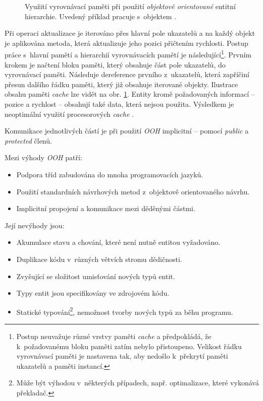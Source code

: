 \begin{figure}[H]
	\centering
	\caption{Využití vyrovnávací paměti při použití \emph{objektově orientované} entitní hierarchie. Uvedený příklad pracuje s~objektem .}
	\label{Fig:OOPCache}
\end{figure}

Při operaci aktualizace je iterováno přes hlavní pole ukazatelů a na každý objekt je aplikována metoda, která aktualizuje jeho pozici přičtením rychlosti. Postup práce s~hlavní pamětí a hierarchií vyrovnávacích pamětí je následující\footnote{Postup neuvažuje různé vrstvy paměti \emph{cache} a předpokládá, že k~požadovanému bloku paměti zatím nebylo přistoupeno. Velikost řádku vyrovnávací paměti je nastavena tak, aby nedošlo k~překrytí paměti ukazatelů a paměti instancí.}. Prvním krokem je načtení bloku paměti, který obsahuje část pole ukazatelů, do vyrovnávací paměti. Následuje dereference prvního z~ukazatelů, která zapříčiní přesun dalšího řádku paměti, který již obsahuje iterované objekty. Ilustrace obsahu paměti \emph{cache} lze vidět na obr. \ref{Fig:OOPCache}. Entity kromě požadovaných informací -- pozice a rychlost -- obsahují také data, která nejsou použita. Výsledkem je neoptimální využití procesorových \emph{cache} \cite{DataOrientedDesignDice}.

Komunikace jednotlivých částí je při použití \emph{OOH} implicitní -- pomocí \emph{public} a \emph{protected} členů. 

\noindent Mezi výhody \emph{OOH} patří: 
\begin{itemize}
	\item Podpora tříd zabudována do mnoha programovacích jazyků.
	\item Použití standardních návrhových metod z~objektově orientovaného návrhu.
	\item Implicitní propojení a komunikace mezi děděnými částmi.
\end{itemize}

\noindent Její nevýhody jsou: 
\begin{itemize}
	\item Akumulace stavu a chování, které není nutně entitou vyžadováno.
	\item Duplikace kódu v~různých větvích stromu dědičnosti.
	\item Zvyšující se složitost umisťování nových typů entit.
	\item Typy entit jsou specifikovány ve zdrojovém kódu.
	\item Statické typování\footnote{Může být výhodou v~některých případech, např. optimalizace, které vykonává překladač.}, nemožnost tvorby nových typů za běhu programu.
\end{itemize}

